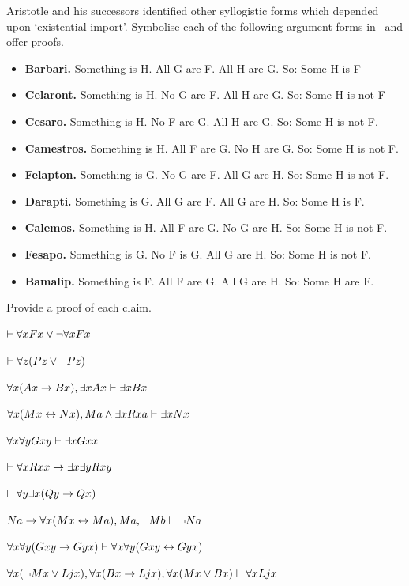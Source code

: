 \problempart
\label{pr.BarbaraEtc.proof2}
Aristotle and his successors identified other syllogistic forms which depended upon `existential import'. Symbolise each of the following argument forms in \FOL\ and offer proofs.
\begin{itemize}
	\item \textbf{Barbari.} Something is H. All G are F. All H are G. So: Some H is F
	\item \textbf{Celaront.} Something is H. No G are F. All H are G. So: Some H is not F
	\item \textbf{Cesaro.} Something is H. No F are G. All H are G. So: Some H is not F.
	\item \textbf{Camestros.} Something is H. All F are G. No H are G. So: Some H is not F.
	\item \textbf{Felapton.} Something is G. No G are F. All G are H. So: Some H is not F.
	\item \textbf{Darapti.} Something is G. All G are F. All G are H. So: Some H is F.
	\item \textbf{Calemos.} Something is H. All F are G. No G are H. So: Some H is not F.
	\item \textbf{Fesapo.} Something is G. No F is G. All G are H. So: Some H is not F.
	\item \textbf{Bamalip.} Something is F. All F are G. All G are H. So: Some H are F.
\end{itemize}
\newpage
\problempart
\label{pr.someFOLproofs}
Provide a proof of each claim.
\begin{earg}
\item $\vdash \forall x Fx \vee \neg \forall x Fx$
\item $\vdash\forall z (Pz \vee \neg Pz)$
\item $\forall x(Ax\rightarrow Bx), \exists x Ax \vdash \exists x Bx$
\item $\forall x(Mx \leftrightarrow Nx), Ma\wedge\exists x Rxa\vdash \exists x Nx$
\item $\forall x \forall y Gxy\vdash\exists x Gxx$
\item $\vdash\forall x Rxx\rightarrow \exists x \exists y Rxy$
\item $\vdash\forall y \exists x (Qy \rightarrow Qx)$
\item $Na \rightarrow \forall x(Mx \leftrightarrow Ma), Ma, \neg Mb\vdash \neg Na$
\item $\forall x \forall y (Gxy \rightarrow Gyx) \vdash \forall x\forall y (Gxy \leftrightarrow Gyx)$
\item $\forall x(\neg Mx \vee Ljx), \forall x(Bx\rightarrow Ljx), \forall x(Mx\vee Bx)\vdash \forall xLjx$
\end{earg}


